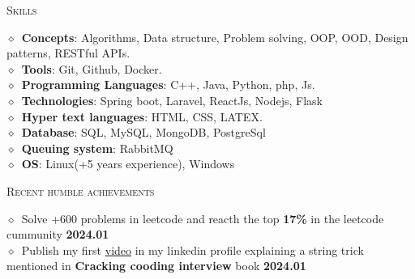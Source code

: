 \documentclass[11pt, a4paper]{article}
\newcommand{\dates}[1]{\hfill\mbox{\textbf{#1}}} %
\newcommand{\smaller}[1]{{\small$\diamond$\ #1}}
\newcommand{\headright}[1]{\vspace*{2.5ex}\textsc{\Large\color{secondColor}#1}\par%
     \vspace*{-2ex}{\color{secondColor}\hrulefill}\par}
\begin{document}
\begin{minipage}[t]{0.56\textwidth}
\headright{Skills}
\smaller{\textbf{Concepts}: Algorithms, Data structure, Problem solving, OOP, OOD, Design patterns, RESTful APIs.} \\
\smaller{\textbf{Tools}: Git, Github, Docker.} \\
\smaller{\textbf{Programming Languages}: C++, Java, Python, php, Js.} \\
\smaller{\textbf{Technologies}: Spring boot, Laravel, ReactJs, Nodejs, Flask} \\
\smaller{\textbf{Hyper text languages}: HTML, CSS, LATEX.} \\ 
\smaller{\textbf{Database}: SQL, MySQL, MongoDB, PostgreSql} \\
\smaller{\textbf{Queuing system}: RabbitMQ} \\
\smaller{\textbf{OS}: Linux(+5 years experience), Windows}

\headright{Recent humble achievements}
\smaller{Solve +600 problems in leetcode and reacth the top \textbf{17\%} in the leetcode cummunity} \dates{2024.01} \\
\smaller{Publish my first \href{https://www.linkedin.com/posts/sofyanmahmoud0000_the-difference-between-str-str-activity-7151649201855045634-XyjD?utm_source=share&utm_medium=member_desktop}{video} in my linkedin profile explaining a string trick mentioned in \textbf{Cracking cooding interview} book} \dates{2024.01} \\

\end{minipage}
\end{document}
